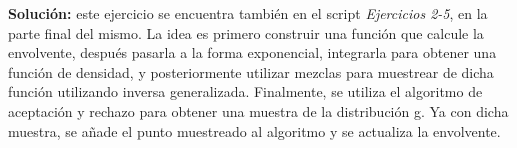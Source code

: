 \documentclass[letterpaper]{article}
\newcommand{\1}{\mathds{1}}
\theoremstyle{definition}
\theoremstyle{definition}
\theoremstyle{definition}
\theoremstyle{definition}
\theoremstyle{definition}
\begin{document}
\begin{enumerate}
    \textbf{Solución: } este ejercicio se encuentra también en el script \textit{Ejercicios 2-5}, en la parte final del mismo. La idea es primero construir
    una función que calcule la envolvente, después pasarla a la forma exponencial, integrarla para obtener una función de densidad, y posteriormente 
    utilizar mezclas para muestrear de dicha función utilizando inversa generalizada. Finalmente, se utiliza el algoritmo de aceptación y rechazo para obtener 
    una muestra de la distribución g. Ya con dicha muestra, se añade el punto muestreado al algoritmo y se actualiza la envolvente.
\end{enumerate}
\end{document}

